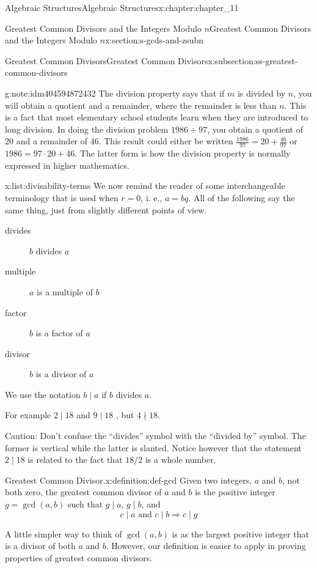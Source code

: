 \documentclass[twoside,10pt,]{book}
\numberwithin{equation}{section}
\begin{document}
\begin{chapterptx}{Algebraic Structures}{}{Algebraic Structures}{}{}{x:chapter:chapter_11}
\begin{sectionptx}{Greatest Common Divisors  and the Integers Modulo \(n\)}{}{Greatest Common Divisors  and the Integers Modulo \(n\)}{}{}{x:section:s-gcds-and-zsubn}
\begin{subsectionptx}{Greatest Common Divisors}{}{Greatest Common Divisors}{}{}{x:subsection:ss-greatest-common-divisors}
\begin{note}{}{g:note:idm404594872432}
The division property says that if \(m\) is divided by \(n\), you will obtain a quotient and a remainder, where the remainder is less than \(n\). This is a fact that most elementary school students learn when they are introduced to long division. In doing the division problem \(1986 \div  97\), you obtain a quotient of 20 and a remainder of 46.  This result could either be written \(\frac{1986}{97}= 20+\frac{46}{97}\) or  \(1986 = 97\cdot 20 + 46\).  The latter form is how the division property is normally expressed in higher mathematics.%
\end{note}
\begin{listptx}{\textbf{}}{x:list:divisability-terms}{}%
We now remind the reader of some interchangeable terminology that is used when \(r=0\), i. e.,  \(a = b q\).  All of the following say the same thing, just from slightly different points of view.%
%
\begin{description}
\item[{divides}]\(b\) divides \(a\)%
\item[{multiple}]\(a\) is a multiple of \(b\)%
\item[{factor}]\(b\) is a factor of \(a\)%
\item[{divisor}]\(b\) is a divisor of \(a\)%
\end{description}
We use the notation   \(b \mid a\)  if  \(b\)  divides \(a\).%
\end{listptx}%
For example  \(2\mid 18\)   and \(9\mid 18\) , but  \(4\nmid 18\).%
\par
Caution:  Don't confuse the ``divides'' symbol with the ``divided by'' symbol.  The former is vertical while the latter is slanted.   Notice however that the statement \(2 \mid 18\) is related to the fact that \(18/2\) is a whole number.%
\begin{definition}{Greatest Common Divisor.}{x:definition:def-gcd}%
%
\label{g:notation:idm404594853392}%
Given two integers, \(a\) and \(b\), not both zero, the greatest common divisor of \(a\) and \(b\) is the positive integer \(g=\gcd(a,b)\) such that  \(g \mid a\),  \(g\mid b\), and%
\begin{equation*}
c\mid a \textrm{ and } c \mid b \Rightarrow c \mid g
\end{equation*}
%
\end{definition}
A little simpler way to think of \(\gcd(a,b)\) is as the largest positive integer that is a divisor of both \(a\) and \(b\).  However, our definition is easier to apply in proving properties of greatest common divisors.%

\end{subsectionptx}
\end{sectionptx}
\end{chapterptx}
\end{document}
